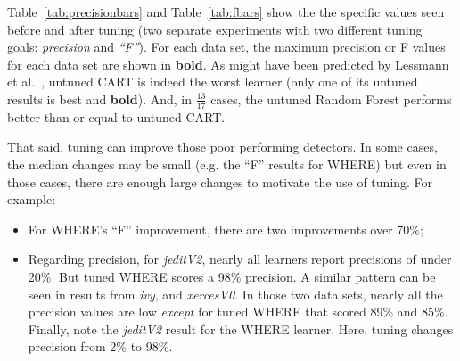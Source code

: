\documentclass{sig-alternative}
\newcommand{\bi}{\begin{itemize}[leftmargin=0.4cm]}
\newcommand{\ei}{\end{itemize}}
\newcommand{\fig}[1]{Figure~\ref{fig:#1}}
\newcommand{\tab}[1]{Table~\ref{tab:#1}}
\begin{document}
 
\tab{precisionbars} and \tab{fbars} show the
the specific values seen before and after tuning (two separate experiments with two different tuning goals: {\em precision} and {\em ``F''}). 
For each data set, the maximum precision or F values for each data set are shown in {\bf bold}.
As might have been
 predicted by Lessmann et al.~\cite{lessmann2008benchmarking}, 
untuned CART is indeed the worst learner (only one of its
untuned results is best and {\bf bold}). 
And, 
in $\frac{13}{17}$ cases, the   untuned Random Forest performs better than or equal to untuned CART.  




That said,  tuning can improve those poor performing detectors.
In some cases, the median changes may be small (e.g. the ``F'' results for WHERE) but even in
those cases, there are enough large changes to motivate the use of tuning. For example:
\bi
\item
For WHERE's ``F'' improvement, there are two improvements over 70\%;
\item
Regarding precision, 
for {\em jeditV2}, nearly all learners report precisions of under 20\%. But tuned  WHERE scores a 98\% precision.  
A similar pattern can be seen in results from {\em ivy},   and {\em xercesV0}.
In those two data sets, nearly all the precision values are   low {\em except} for
tuned WHERE that scored 89\% and 85\%.
Finally, note the  {\em jeditV2} result for the WHERE learner.
Here, tuning changes precision from 2\% to 98\%.
\ei

\end{document}
